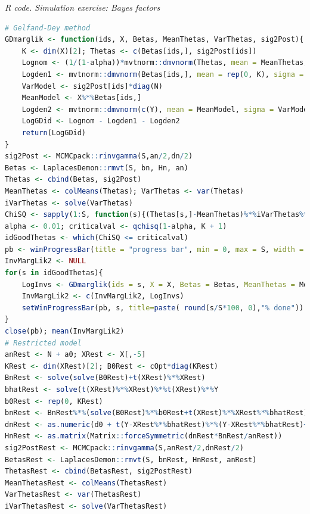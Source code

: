 \begin{tcolorbox}[enhanced,width=4.67in,center upper,
	fontupper=\large\bfseries,drop shadow southwest,sharp corners]
	\textit{R code. Simulation exercise: Bayes factors}
	\begin{VF}
		\begin{lstlisting}[language=R]
# Gelfand-Dey method
GDmarglik <- function(ids, X, Betas, MeanThetas, VarThetas, sig2Post){
	K <- dim(X)[2]; Thetas <- c(Betas[ids,], sig2Post[ids])
	Lognom <- (1/(1-alpha))*mvtnorm::dmvnorm(Thetas, mean = MeanThetas, sigma = VarThetas, log = TRUE, checkSymmetry = TRUE)
	Logden1 <- mvtnorm::dmvnorm(Betas[ids,], mean = rep(0, K), sigma = sig2Post[ids]*cOpt*diag(K), log = TRUE, checkSymmetry = TRUE) + log(MCMCpack::dinvgamma(sig2Post[ids], a0/2, d0/2))
	VarModel <- sig2Post[ids]*diag(N)
	MeanModel <- X%*%Betas[ids,]
	Logden2 <- mvtnorm::dmvnorm(c(Y), mean = MeanModel, sigma = VarModel, log = TRUE, checkSymmetry = TRUE)
	LogGDid <- Lognom - Logden1 - Logden2
	return(LogGDid)
}
sig2Post <- MCMCpack::rinvgamma(S,an/2,dn/2)
Betas <- LaplacesDemon::rmvt(S, bn, Hn, an)
Thetas <- cbind(Betas, sig2Post)
MeanThetas <- colMeans(Thetas); VarThetas <- var(Thetas)
iVarThetas <- solve(VarThetas)
ChiSQ <- sapply(1:S, function(s){(Thetas[s,]-MeanThetas)%*%iVarThetas%*%(Thetas[s,]-MeanThetas)})
alpha <- 0.01; criticalval <- qchisq(1-alpha, K + 1)
idGoodThetas <- which(ChiSQ <= criticalval)
pb <- winProgressBar(title = "progress bar", min = 0, max = S, width = 300)
InvMargLik2 <- NULL
for(s in idGoodThetas){
	LogInvs <- GDmarglik(ids = s, X = X, Betas = Betas, MeanThetas = MeanThetas, VarThetas = VarThetas, sig2Post = sig2Post)
	InvMargLik2 <- c(InvMargLik2, LogInvs)
	setWinProgressBar(pb, s, title=paste( round(s/S*100, 0),"% done"))
}
close(pb); mean(InvMargLik2)
# Restricted model
anRest <- N + a0; XRest <- X[,-5]
KRest <- dim(XRest)[2]; B0Rest <- cOpt*diag(KRest) 
BnRest <- solve(solve(B0Rest)+t(XRest)%*%XRest)
bhatRest <- solve(t(XRest)%*%XRest)%*%t(XRest)%*%Y
b0Rest <- rep(0, KRest)
bnRest <- BnRest%*%(solve(B0Rest)%*%b0Rest+t(XRest)%*%XRest%*%bhatRest)
dnRest <- as.numeric(d0 + t(Y-XRest%*%bhatRest)%*%(Y-XRest%*%bhatRest)+t(bhatRest - b0Rest)%*%solve(solve(t(XRest)%*%XRest)+B0Rest)%*%(bhatRest - b0Rest))
HnRest <- as.matrix(Matrix::forceSymmetric(dnRest*BnRest/anRest))
sig2PostRest <- MCMCpack::rinvgamma(S,anRest/2,dnRest/2)
BetasRest <- LaplacesDemon::rmvt(S, bnRest, HnRest, anRest)
ThetasRest <- cbind(BetasRest, sig2PostRest)
MeanThetasRest <- colMeans(ThetasRest)
VarThetasRest <- var(ThetasRest)
iVarThetasRest <- solve(VarThetasRest)
\end{lstlisting}
	\end{VF}
\end{tcolorbox}  

